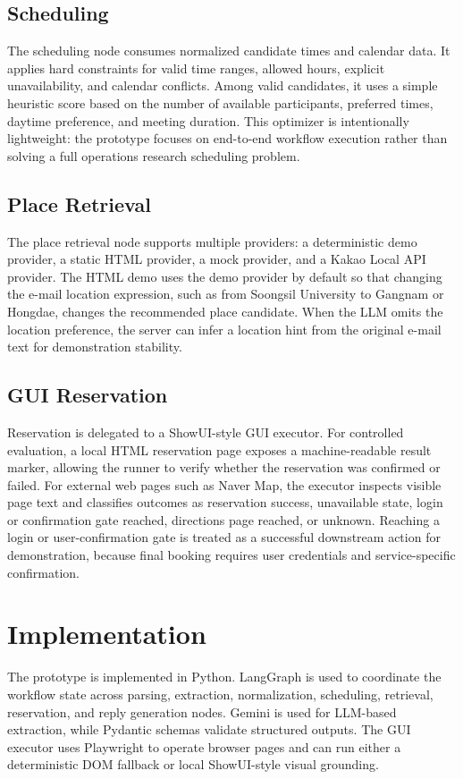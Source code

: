 \documentclass[sigconf,nonacm]{acmart}
\begin{document}
\subsection{Scheduling}
The scheduling node consumes normalized candidate times and calendar data. It applies hard constraints for valid time ranges, allowed hours, explicit unavailability, and calendar conflicts. Among valid candidates, it uses a simple heuristic score based on the number of available participants, preferred times, daytime preference, and meeting duration. This optimizer is intentionally lightweight: the prototype focuses on end-to-end workflow execution rather than solving a full operations research scheduling problem.

\subsection{Place Retrieval}
The place retrieval node supports multiple providers: a deterministic demo provider, a static HTML provider, a mock provider, and a Kakao Local API provider. The HTML demo uses the demo provider by default so that changing the e-mail location expression, such as from Soongsil University to Gangnam or Hongdae, changes the recommended place candidate. When the LLM omits the location preference, the server can infer a location hint from the original e-mail text for demonstration stability.

\subsection{GUI Reservation}
Reservation is delegated to a ShowUI-style GUI executor. For controlled evaluation, a local HTML reservation page exposes a machine-readable result marker, allowing the runner to verify whether the reservation was confirmed or failed. For external web pages such as Naver Map, the executor inspects visible page text and classifies outcomes as reservation success, unavailable state, login or confirmation gate reached, directions page reached, or unknown. Reaching a login or user-confirmation gate is treated as a successful downstream action for demonstration, because final booking requires user credentials and service-specific confirmation.

\section{Implementation}
The prototype is implemented in Python. LangGraph is used to coordinate the workflow state across parsing, extraction, normalization, scheduling, retrieval, reservation, and reply generation nodes. Gemini is used for LLM-based extraction, while Pydantic schemas validate structured outputs. The GUI executor uses Playwright to operate browser pages and can run either a deterministic DOM fallback or local ShowUI-style visual grounding.
\end{document}
